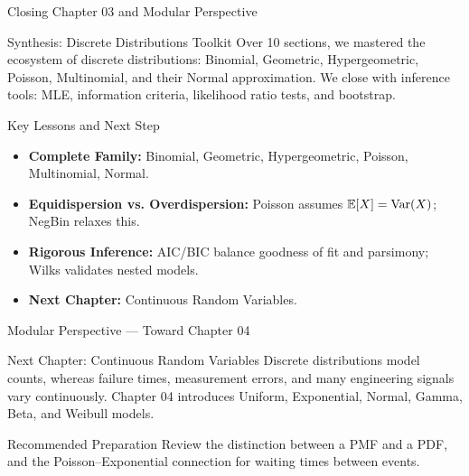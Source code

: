 \documentclass[aspectratio=169,xcolor={dvipsnames,table}]{beamer}
\begin{document}
\begin{frame}{Closing Chapter 03 and Modular Perspective}
	\vspace{-0.3cm}
	\begin{block}{Synthesis: Discrete Distributions Toolkit}
		\scriptsize
		Over 10 sections, we mastered the ecosystem of discrete distributions: Binomial, Geometric, Hypergeometric, Poisson, Multinomial, and their Normal approximation. We close with inference tools: MLE, information criteria, likelihood ratio tests, and bootstrap.
	\end{block}
	\vspace{0.0cm}
	\pause
	\begin{alertblock}{Key Lessons and Next Step}
		\begin{itemize}\itemsep=0.02cm
			\item \textbf{Complete Family:} Binomial, Geometric, Hypergeometric, Poisson, Multinomial, Normal.
			\item \textbf{Equidispersion vs. Overdispersion:} Poisson assumes $\mathbb{E}[X] = \operatorname{Var}(X)$; NegBin relaxes this.
			\item \textbf{Rigorous Inference:} AIC/BIC balance goodness of fit and parsimony; Wilks validates nested models.
			\item \textbf{Next Chapter:} \textcolor{TecRojo}{Continuous Random Variables}.
		\end{itemize}
	\end{alertblock}
\end{frame}

\begin{frame}{Modular Perspective --- Toward Chapter 04}
\scriptsize
\begin{alertblock}{Next Chapter: Continuous Random Variables}
Discrete distributions model counts, whereas failure times, measurement errors,
and many engineering signals vary continuously. Chapter 04 introduces Uniform,
Exponential, Normal, Gamma, Beta, and Weibull models.
\end{alertblock}
\vspace{0.08cm}
\begin{block}{Recommended Preparation}
Review the distinction between a PMF and a PDF, and the Poisson--Exponential
connection for waiting times between events.
\end{block}
\end{frame}
\end{document}
